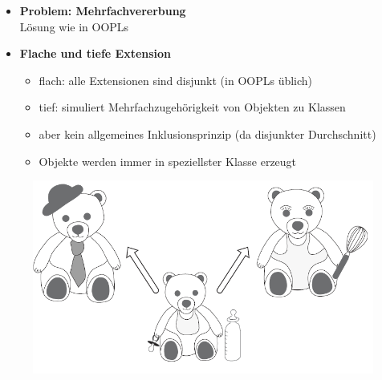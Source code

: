 \begin{itemize}
	\item \textbf{Problem: Mehrfachvererbung}\\
	Lösung wie in OOPLs
	
	\item \textbf{Flache und tiefe Extension}
	\begin{itemize}
		\item flach: alle Extensionen sind disjunkt (in OOPLs üblich)
		\item tief: simuliert Mehrfachzugehörigkeit von Objekten zu Klassen
		\item aber kein allgemeines Inklusionsprinzip (da disjunkter Durchschnitt)
		\item Objekte werden immer in speziellster Klasse erzeugt
	\end{itemize}
\end{itemize}

\begin{figure}[!h]
	\centering
	\includegraphics[scale=0.5]{img/struc_5.png}
\end{figure}

